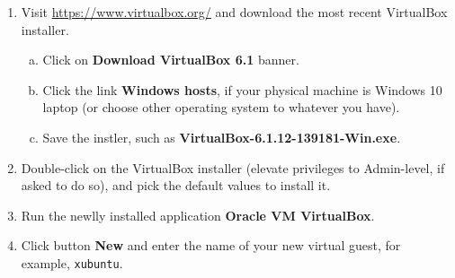 \documentclass[11pt,a4paper]{article}
\begin{document}
\begin{enumerate}
\item Visit \url{https://www.virtualbox.org/} and download the most recent 
VirtualBox installer. 
\begin{enumerate}[(a)]
\item Click on {\bf Download VirtualBox 6.1} banner. 
\item Click the link {\bf Windows hosts}, if your physical machine is Windows 10 laptop 
(or choose other operating system \textendash{} to whatever you have). 
\item Save the instler, such as {\bf VirtualBox-6.1.12-139181-Win.exe}. 
\end{enumerate}
\item Double-click on the VirtualBox installer (elevate privileges
to Admin-level, if asked to do so), and pick the default values to install it.
\item Run the newlly installed application {\bf Oracle VM VirtualBox}.\\
\item Click button {\bf New} and enter the name of your new virtual guest, for example, {\tt xubuntu}.\\

\end{enumerate}
\end{document}
